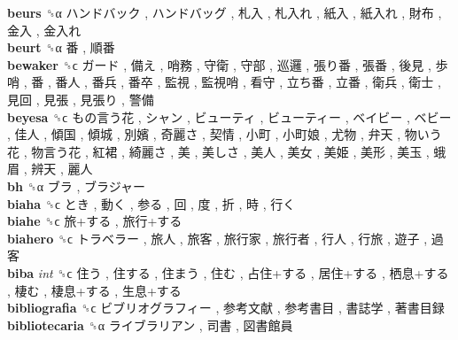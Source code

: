 \textbf{beurs} ␝α   ハンドバック ,  ハンドバッグ ,  札入 ,  札入れ ,  紙入 ,  紙入れ ,  財布 ,  金入 ,  金入れ   \\
\textbf{beurt} ␝α   番 ,  順番   \\
\textbf{bewaker} ␝ϲ   ガード ,  備え ,  哨務 ,  守衛 ,  守部 ,  巡邏 ,  張り番 ,  張番 ,  後見 ,  歩哨 ,  番 ,  番人 ,  番兵 ,  番卒 ,  監視 ,  監視哨 ,  看守 ,  立ち番 ,  立番 ,  衛兵 ,  衛士 ,  見回 ,  見張 ,  見張り ,  警備   \\
\textbf{beyesa} ␝ϲ   もの言う花 ,  シャン ,  ビューティ ,  ビューティー ,  ベイビー ,  ベビー ,  佳人 ,  傾国 ,  傾城 ,  別嬪 ,  奇麗さ ,  契情 ,  小町 ,  小町娘 ,  尤物 ,  弁天 ,  物いう花 ,  物言う花 ,  紅裙 ,  綺麗さ ,  美 ,  美しさ ,  美人 ,  美女 ,  美姫 ,  美形 ,  美玉 ,  蛾眉 ,  辨天 ,  麗人   \\
\textbf{bh} ␝α   ブラ ,  ブラジャー   \\
\textbf{biaha} ␝ϲ   とき ,  動く ,  参る ,  回 ,  度 ,  折 ,  時 ,  行く   \\
\textbf{biahe} ␝ϲ   旅+する ,  旅行+する   \\
\textbf{biahero} ␝ϲ   トラベラー ,  旅人 ,  旅客 ,  旅行家 ,  旅行者 ,  行人 ,  行旅 ,  遊子 ,  過客   \\
\textbf{biba} \emph{int}  ␝ϲ   住う ,  住する ,  住まう ,  住む ,  占住+する ,  居住+する ,  栖息+する ,  棲む ,  棲息+する ,  生息+する   \\
\textbf{bibliografia} ␝ϲ   ビブリオグラフィー ,  参考文献 ,  参考書目 ,  書誌学 ,  著書目録   \\
\textbf{bibliotecaria} ␝α   ライブラリアン ,  司書 ,  図書館員   \\
